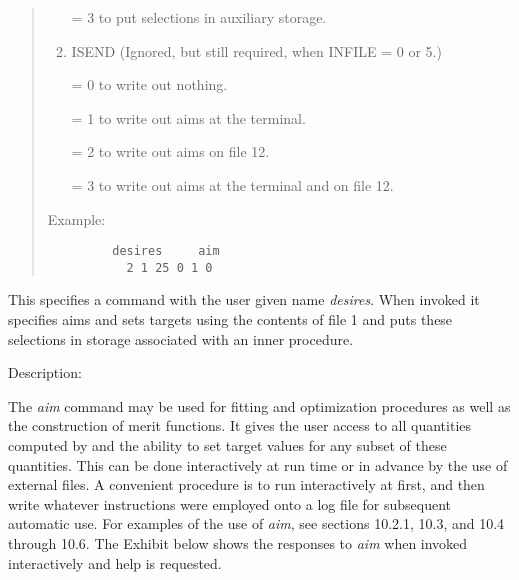 \begin{quotation}
\begin{enumerate}
              = 3 to put selections in auxiliary storage.

       \item  ISEND (Ignored, but still required, when INFILE = 0 or 5.)

              = 0 to write out nothing.

              = 1 to write out aims at the terminal.

              = 2 to write out aims on file 12.

              = 3 to write out aims at the terminal and on file 12.
\end{enumerate}

\vspace{5mm}
\noindent Example:
\begin{verbatim}
         desires     aim
           2 1 25 0 1 0
\end{verbatim}
\end{quotation}
This specifies a command with the user given name {\em desires}.  When invoked it specifies aims and sets targets using the contents of file 1 and puts these selections in storage associated with an inner procedure.

\vspace{5mm}
     Description:
\vspace{2mm}

The {\em aim} command may be used for fitting and optimization procedures as well as the construction of merit functions.  It gives the user access to all quantities computed by \Mary and the ability to set target values for any subset of these quantities.  This can be done interactively at run time or in advance by the use of external files.  A convenient procedure is to run interactively at first, and then write whatever instructions were employed onto a log file for subsequent automatic use.  For examples of the use of {\em aim}, see sections 10.2.1, 10.3, and 10.4 through 10.6.  The Exhibit below shows the responses to {\em aim} when invoked interactively and help is requested.  

